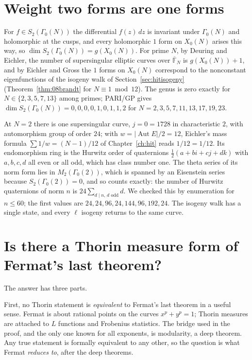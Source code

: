 \section{Weight two forms are one forms}\label{sec:fltoneforms}

For $f\in S_2(\Gamma_0(N))$ the differential $f(z)\,dz$ is invariant under $\Gamma_0(N)$ and holomorphic at the cusps, and every holomorphic $1$ form on $X_0(N)$ arises this way, so $\dim S_2(\Gamma_0(N))=g(X_0(N))$. For prime $N$, by Deuring \cite{deuring1941} and Eichler, the number of supersingular elliptic curves over $\overline{\mathbb F}_N$ is $g(X_0(N))+1$, and by Eichler and Gross the $1$ forms on $X_0(N)$ correspond to the nonconstant eigenfunctions of the isogeny walk of Section~\ref{sec:hitisogeny} \cite{eichler1954,eichler1973,gross1987} (Theorem~\ref{thm:08brandt} for $N\equiv1\bmod12$). The genus is zero exactly for $N\in\{2,3,5,7,13\}$ among primes; PARI/GP gives $\dim S_2(\Gamma_0(N))=0,0,0,0,1,0,1,1,2$ for $N=2,3,5,7,11,13,17,19,23$.

At $N=2$ there is one supersingular curve, $j=0=1728$ in characteristic $2$, with automorphism group of order $24$; with $w=|\operatorname{Aut}E|/2=12$, Eichler's mass formula $\sum1/w=(N-1)/12$ of Chapter~\ref{ch:hit} reads $1/12=1/12$. Its endomorphism ring is the Hurwitz order of quaternions $\frac12(a+bi+cj+dk)$ with $a,b,c,d$ all even or all odd, which has class number one. The theta series of its norm form lies in $M_2(\Gamma_0(2))$, which is spanned by an Eisenstein series because $S_2(\Gamma_0(2))=0$, and so counts exactly: the number of Hurwitz quaternions of norm $n$ is $24\sum_{d\mid n,\,d\text{ odd}}d$. We checked this by enumeration for $n\le60$; the first values are $24,24,96,24,144,96,192,24$. The isogeny walk has a single state, and every $\ell$ isogeny returns to the same curve.

\section{Is there a Thorin measure form of Fermat's last theorem?}\label{sec:fltthorin}

The answer has three parts.

First, no Thorin statement is \emph{equivalent} to Fermat's last theorem in a useful sense. Fermat is about rational points on the curves $x^p+y^p=1$; Thorin measures are attached to $L$ functions and Frobenius statistics. The bridge used in the proof, and the only one known for all exponents, is modularity, a deep theorem. Any true statement is formally equivalent to any other, so the question is what Fermat \emph{reduces to}, after the deep theorems.

